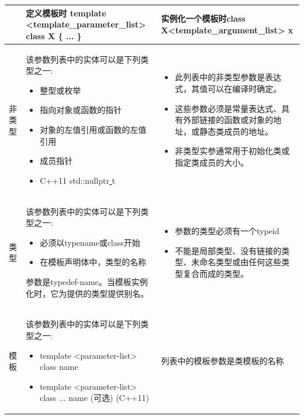 \begin{table}[h]
	\begin{tabularx}{\textwidth}{|p{2cm}|X|X|}
		\hline
		& 定义模板时 template <template\_parameter\_list> class X \{ ... \} & 实例化一个模板时class X<template\_argument\_list> x \\ 
		
		\hline
		非类型
		 & 
		该参数列表中的实体可以是下列类型之一:
		\begin{itemize}
			\item 整型或枚举
			\item 指向对象或函数的指针
			\item 对象的左值引用或函数的左值引用
			\item 成员指针
			\item C++11 std::nullptr\underline{ }t
		\end{itemize} & 
		\begin{itemize}
		\item 此列表中的非类型参数是表达式，其值可以在编译时确定。
		\item 这些参数必须是常量表达式、具有外部链接的函数或对象的地址，或静态类成员的地址。
		\item 非类型实参通常用于初始化类或指定类成员的大小。
		\end{itemize} \\
		\hline
		类型 
		& 
		该参数列表中的实体可以是下列类型之一:
		\begin{itemize}
			\item 必须以typename或class开始
			\item 在模板声明体中，类型的名称	
		\end{itemize} 
		参数是typedef-name。当模板实例化时，它为提供的类型提供别名。
		& 
		\begin{itemize}
			\item 参数的类型必须有一个typeid
			\item 不能是局部类型、没有链接的类型、未命名类型或由任何这些类型复合而成的类型。
		\end{itemize} \\
		\hline
		模板 
		& 
		该参数列表中的实体可以是下列类型之一:
		\begin{itemize}
			\item template <parameter-list> class name
			\item template <parameter-list> class ... name
			(可选) (C++11)
		\end{itemize} 
		& 
		列表中的模板参数是类模板的名称 \\
		\hline
	\end{tabularx}
\end{table}


